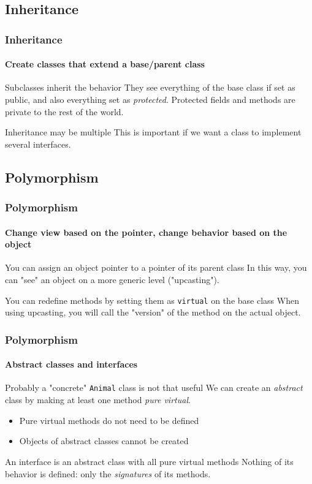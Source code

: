 \subsection{Inheritance}

\begin{frame}
\frametitle{Inheritance}
\framesubtitle{Create classes that extend a base/parent class}

\begin{block}{Subclasses inherit the behavior}
They see everything of the base class if set as public, and also everything set as {\em protected}. Protected fields and methods are private to the rest of the world.
\end{block}
\pause
\begin{block}{Inheritance may be multiple}
This is important if we want a class to implement several interfaces.
\end{block}

\end{frame}

\subsection{Polymorphism}

\begin{frame}
\frametitle{Polymorphism}
\framesubtitle{Change view based on the pointer, change behavior based on the object}

\begin{block}{You can assign an object pointer to a pointer of its parent class}
In this way, you can "see" an object on a more generic level ("upcasting").
\end{block}
\pause
\begin{block}{You can redefine methods by setting them as \texttt{virtual} on the base class}
When using upcasting, you will call the "version" of the method on the actual object.
\end{block}

\end{frame}

\begin{frame}
\frametitle{Polymorphism}
\framesubtitle{Abstract classes and interfaces}

\begin{block}{Probably a "concrete" \texttt{Animal} class is not that useful}
We can create an {\em abstract} class by making at least one method {\em pure virtual}.
\begin{itemize}
\item Pure virtual methods do not need to be defined
\item Objects of abstract classes cannot be created
\end{itemize}
\end{block}
\pause
\begin{block}{An interface is an abstract class with all pure virtual methods}
Nothing of its behavior is defined: only the {\em signatures} of its methods.
\end{block}

\end{frame}

